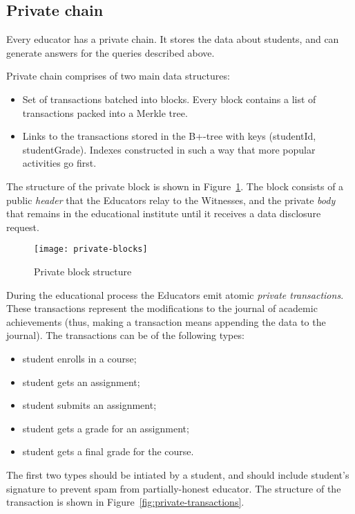 \subsection{Private chain}
\label{sec:priv-chain}

Every educator has a private chain. It stores the data about students, and can
generate answers for the queries described above.

Private chain comprises of two main data structures:
\begin{itemize}
\item Set of transactions batched into blocks. Every block contains a list of
  transactions packed into a Merkle tree.
\item Links to the transactions stored in the B+-tree with keys (studentId,
  studentGrade). Indexes constructed in such a way that more popular activities
  go first.
\end{itemize}

The structure of the private block is shown in Figure~\ref{fig:privateblocks}.
The block consists of a public \textit{header} that the Educators relay to the
Witnesses, and the private \textit{body} that remains in the educational
institute until it receives a data disclosure request.

\begin{figure}[ht]
\centering
\texttt{[image: private-blocks]}
\caption{Private block structure}
\label{fig:privateblocks}
\end{figure}

During the educational process the Educators emit atomic \textit{private
  transactions}. These transactions represent the modifications to the journal of
academic achievements (thus, making a transaction means appending the data to
the journal). The transactions can be of the following types:

\begin{itemize}
\item student enrolls in a course;
\item student gets an assignment;
\item student submits an assignment;
\item student gets a grade for an assignment;
\item student gets a final grade for the course.
\end{itemize}

The first two types should be intiated by a student, and should include
student's signature to prevent spam from partially-honest educator. The
structure of the transaction is shown in Figure~\ref{fig:private-transactions}.


